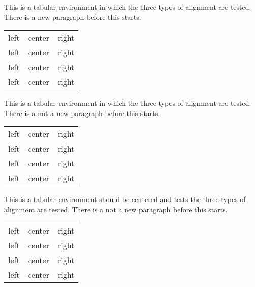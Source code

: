 \documentclass{article}
\begin{document}
This is a tabular environment in which the three types of alignment are
tested.  There is a new paragraph before this starts.

\begin{tabular}{lcr}
left & center & right \\
left & center & right \\
left & center & right \\
left & center & right \\
\end{tabular}

This is a tabular environment in which the three types of alignment are
tested.  There is a not a new paragraph before this starts.
\begin{tabular}{lcr}
left & center & right \\
left & center & right \\
left & center & right \\
left & center & right \\
\end{tabular}

This is a tabular environment should be centered and tests the three types of alignment are
tested.  There is a not a new paragraph before this starts.
\begin{center}
\begin{tabular}{lcr}
left & center & right \\
left & center & right \\
left & center & right \\
left & center & right \\
\end{tabular}
\end{center}
\end{document}
